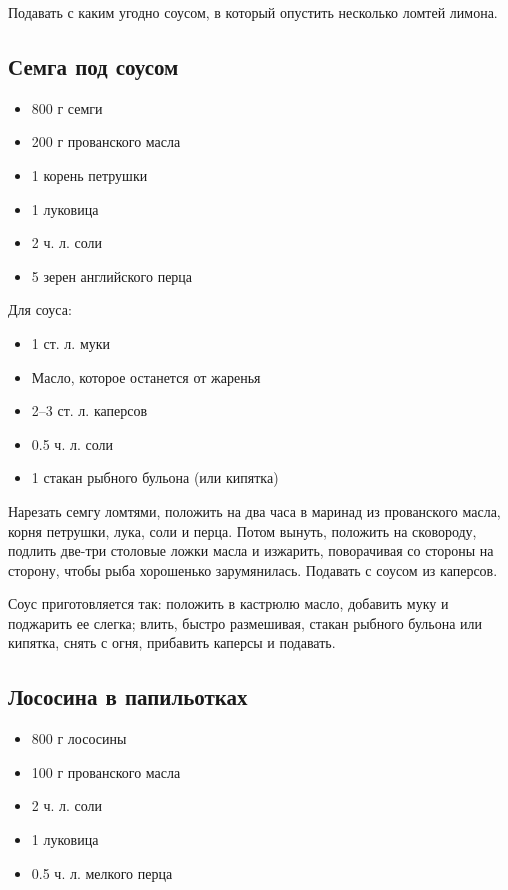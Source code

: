 Подавать с каким угодно соусом, в который опустить несколько ломтей лимона.

\subsection{Семга под соусом}

\begin{itemize} 
	\item  800 г семги 
    \item  200 г прованского масла 
    \item  1 корень петрушки 
    \item  1 луковица 
    \item  2 ч. л. соли 
    \item  5 зерен английского перца
\end{itemize}
    
Для соуса: 

\begin{itemize} 
	\item  1 ст. л. муки 
    \item  Масло, которое останется от жаренья 
    \item  2–3 ст. л. каперсов 
    \item  0.5 ч. л. соли 
    \item  1 стакан рыбного бульона (или кипятка)
\end{itemize}

Нарезать семгу ломтями, положить на два часа в маринад из прованского масла, корня петрушки, лука, соли и перца. Потом вынуть, положить на сковороду, подлить две-три столовые ложки масла и изжарить, поворачивая со стороны на сторону, чтобы рыба хорошенько зарумянилась. Подавать с соусом из каперсов.

Соус приготовляется так: положить в кастрюлю масло, добавить муку и поджарить ее слегка; влить, быстро размешивая, стакан рыбного бульона или кипятка, снять с огня, прибавить каперсы и подавать.

\subsection{Лососина в папильотках}

\begin{itemize} 
	\item  800 г лососины 
    \item  100 г прованского масла 
    \item  2 ч. л. соли 
    \item  1 луковица 
    \item  0.5 ч. л. мелкого перца
\end{itemize}

